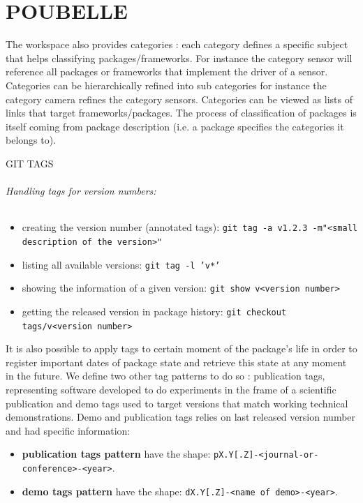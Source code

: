 \documentclass[12pt,a4paper]{article}
\begin{document}
\pagebreak

\part*{POUBELLE}

 The workspace also provides categories : each category defines a specific subject that helps classifying packages/frameworks. For instance the category sensor will reference all packages or frameworks that implement the driver of a sensor. Categories can be hierarchically refined into sub categories for instance the category camera refines the category sensors. Categories can be viewed as lists of links that target frameworks/packages. The process of classification of packages is itself coming from package description (i.e. a package specifies the categories it belongs to).
 
 
GIT TAGS
 
\paragraph{Handling tags for version numbers:}
\begin{itemize}
\item creating the version number (annotated tags):
\linebreak \texttt{git tag -a v1.2.3 -m"<small description of the version>"}
\item listing all available versions: 
\linebreak \texttt{git tag -l 'v*'}
\item showing the information of a given version: 
\linebreak \texttt{git show v<version number>}
\item getting the released version in package history: 
\linebreak \texttt{git checkout tags/v<version number>}
\end{itemize}


It is also possible to apply tags to certain moment of the package's life in order to register important dates of package state and retrieve this state at any moment in the future. We define two other tag patterns to do so : publication tags, representing software developed to do experiments in the frame of a scientific publication and demo tags used to target versions that match working technical demonstrations. Demo and publication tags relies on last released version number and had specific information:
\begin{itemize}
\item \textbf{publication tags pattern} have the shape: \linebreak \texttt{pX.Y[.Z]-<journal-or-conference>-<year>}.
\item \textbf{demo tags pattern} have the shape:
\linebreak \texttt{dX.Y[.Z]-<name of demo>-<year>}.
\end{itemize}
 
\end{document}
